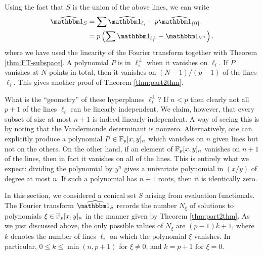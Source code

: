 Using the fact that $S$ is the union of the above lines, we can write
\begin{align*}
	\widehat{\IND_S} &= \sum \widehat{\IND_{\ell_i}} - p\widehat{\IND_{\{0\}}} \\
	&= p\left(\sum \IND_{\ell_i^\bot} - \IND_{V^*}\right).
\end{align*}
where we have used the linearity of the Fourier transform together with Theorem \ref{thm:FT-subspace}. A polynomial $P$ is in $\ell_i^\bot$ when it vanishes on $\ell_i$. If $P$ vanishes at $N$ points in total, then it vanishes on $(N - 1)/(p-1)$ of the lines $\ell_i$. This gives another proof of Theorem \ref{thm:part2thm}.

What is the ``geometry'' of these hyperplanes $\ell_i^\bot$? If $n < p$ then clearly not all $p+1$ of the lines $\ell_i$ can be linearly independent. We claim, however, that every subset of size at most $n+1$ is indeed linearly independent. A way of seeing this is by noting that the Vandermonde determinant is nonzero. Alternatively, one can explicitly produce a polynomial $P \in \mathbb{F}_p[x,y]_n$ which vanishes on $n$ given lines but not on the others. On the other hand, if an element of $\mathbb{F}_p[x,y]_n$ vanishes on $n+1$ of the lines, then in fact it vanishes on all of the lines. This is entirely what we expect: dividing the polynomial by $y^n$ gives a univariate polynomial in $(x/y)$ of degree at most $n$. If such a polynomial has $n+1$ roots, then it is identically zero.

In this section, we considered a conical set $S$ arising from evaluation functionals. The Fourier transform $\widehat{\IND_S}$ records the number $N_\xi$ of solutions to polynomials $\xi\in\mathbb{F}_p[x,y]_n$ in the manner given by Theorem \ref{thm:part2thm}. As we just discussed above, the only possible values of $N_\xi$ are $(p-1)k + 1$, where $k$ denotes the number of lines $\ell_i$ on which the polynomial $\xi$ vanishes. In particular, $0 \leq k \leq \min(n,p+1)$ for $\xi\neq 0$, and $k=p+1$ for $\xi = 0$.
